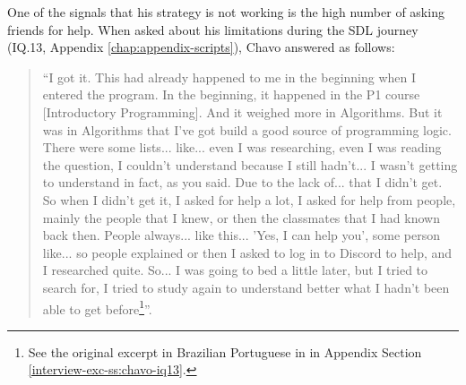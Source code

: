 One of the signals that his strategy is not working is the high number of asking friends for help. When asked about his limitations during the \gls{SDL} journey (\gls{IQ}.13, Appendix \ref{chap:appendix-scripts}), Chavo answered as follows:
\begin{quote}
    “I got it. This had already happened to me in the beginning when I entered the program. In the beginning, it happened in the P1 course [Introductory Programming]. And it weighed more in Algorithms. But it was in Algorithms that I've got build a good source of programming logic. There were some lists... like... even I was researching, even I was reading the question, I couldn't understand because I still hadn't... I wasn't getting to understand in fact, as you said. Due to the lack of... that I didn't get. So when I didn't get it, I asked for help a lot, I asked for help from people, mainly the people that I knew, or then the classmates that I had known back then. People always... like this... 'Yes, I can help you', some person like... so people explained or then I asked to log in to Discord to help, and I researched quite. So... I was going to bed a little later, but I tried to search for, I tried to study again to understand better what I hadn't been able to get before\footnote{See the original excerpt in Brazilian Portuguese in in Appendix Section \ref{interview-exc-ss:chavo-iq13}.}”.
\end{quote}

